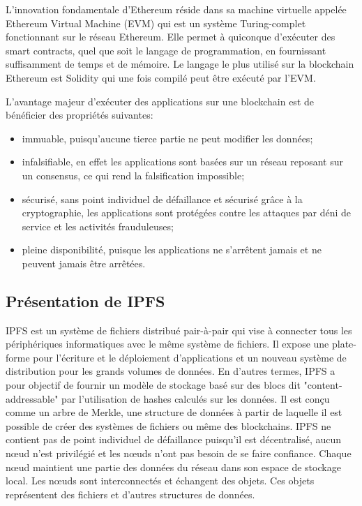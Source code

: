 \documentclass{tnreport}
\begin{document}
L'innovation fondamentale d'Ethereum réside dans sa machine virtuelle appelée Ethereum Virtual Machine (EVM) qui est un système Turing-complet fonctionnant sur le réseau Ethereum. Elle permet à quiconque d'exécuter des smart contracts, quel que soit le langage de programmation, en fournissant suffisamment de temps et de mémoire. Le langage le plus utilisé sur la blockchain Ethereum est Solidity qui une fois compilé peut être exécuté par l'EVM.

L'avantage majeur d'exécuter des applications sur une blockchain est de bénéficier des propriétés suivantes:
\begin{itemize}
	\item immuable, puisqu'aucune tierce partie ne peut modifier les données;
	\item infalsifiable, en effet les applications sont basées sur un réseau reposant sur un consensus, ce qui rend la falsification impossible;
	\item sécurisé, sans point individuel de défaillance et sécurisé grâce à la cryptographie, les applications sont protégées contre les attaques par déni de service et les activités frauduleuses;
	\item pleine disponibilité, puisque les applications ne s'arrêtent jamais et ne peuvent jamais être arrêtées.
\end{itemize}

\subsection{Présentation de IPFS}

IPFS est un système de fichiers distribué pair-à-pair qui vise à connecter tous les périphériques informatiques avec le même système de fichiers. Il expose une plate-forme pour l'écriture et le déploiement d'applications et un nouveau système de distribution pour les grands volumes de données. 
En d'autres termes, IPFS a pour objectif de fournir un modèle de stockage basé sur des blocs dit "content-addressable" par l'utilisation de hashes calculés sur les données. Il est conçu comme un arbre de Merkle, une structure de données à partir de laquelle il est possible de créer des systèmes de fichiers ou même des blockchains. IPFS ne contient pas de point individuel de défaillance puisqu'il est décentralisé, aucun nœud n'est privilégié et les nœuds n'ont pas besoin de se faire confiance. 
Chaque nœud maintient une partie des données du réseau dans son espace de stockage local. 
Les nœuds sont interconnectés et échangent des objets. Ces objets représentent des fichiers et d'autres structures de données.
\end{document}
